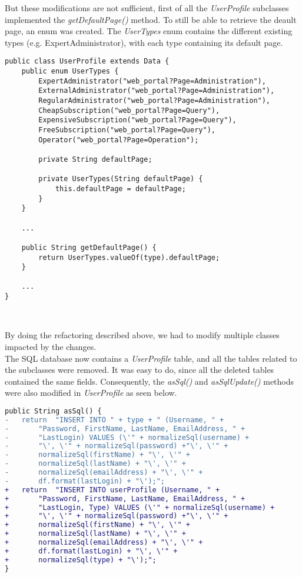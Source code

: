But these modifications are not sufficient, first of all the
\emph{UserProfile} subclasses implemented the \emph{getDefaultPage()}
method. To still be able to retrieve the deault page, an enum was
created. The \emph{UserTypes} enum contains the different existing types
(e.g. ExpertAdministrator), with each type containing its default page.\\

\begin{lstlisting}[caption={UserTypes enum and default page}]
public class UserProfile extends Data {
    public enum UserTypes {
        ExpertAdministrator("web_portal?Page=Administration"),
        ExternalAdministrator("web_portal?Page=Administration"),
        RegularAdministrator("web_portal?Page=Administration"),
        CheapSubscription("web_portal?Page=Query"),
        ExpensiveSubscription("web_portal?Page=Query"),
        FreeSubscription("web_portal?Page=Query"),
        Operator("web_portal?Page=Operation");
        
        private String defaultPage;
 
        private UserTypes(String defaultPage) {
            this.defaultPage = defaultPage;
        }
    }
    
    ...
    
    public String getDefaultPage() {
        return UserTypes.valueOf(type).defaultPage;
    }
    
    ...
}
\end{lstlisting}
\

By doing the refactoring described above, we had to modify multiple classes
impacted by the changes.\\

The SQL database now contains a \emph{UserProfile} table, and all the tables
related to the subclasses were removed. It was easy to do, since all the
deleted tables contained the same fields. Consequently, the \emph{asSql()}
and \emph{asSqlUpdate()} methods were also modified in \emph{UserProfile} as
seen below.\\

\begin{lstlisting}[language=diff, caption={UserProfile asSql() diff}]
public String asSql() {
-   return  "INSERT INTO " + type + " (Username, " +
-       "Password, FirstName, LastName, EmailAddress, " +
-       "LastLogin) VALUES (\'" + normalizeSql(username) +
-       "\', \'" + normalizeSql(password) +"\', \'" +
-       normalizeSql(firstName) + "\', \'" +
-       normalizeSql(lastName) + "\', \'" +
-       normalizeSql(emailAddress) + "\', \'" +
-       df.format(lastLogin) + "\');";
+   return  "INSERT INTO userProfile (Username, " +
+       "Password, FirstName, LastName, EmailAddress, " +
+       "LastLogin, Type) VALUES (\'" + normalizeSql(username) +
+       "\', \'" + normalizeSql(password) +"\', \'" +
+       normalizeSql(firstName) + "\', \'" +
+       normalizeSql(lastName) + "\', \'" +
+       normalizeSql(emailAddress) + "\', \'" +
+       df.format(lastLogin) + "\', \'" +
+       normalizeSql(type) + "\');";
}
\end{lstlisting}
\

